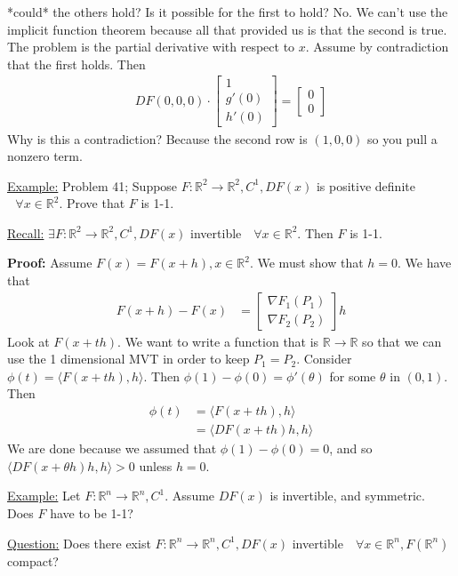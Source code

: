 \documentclass{article}
\newcommand*{\txt}[1]{\text{ #1 }}%
\newcommand*{\iprod}[1]{\langle #1 \rangle}
\newcommand*{\fora}{\txt{}\forall}%
\newcommand*{\rr}{\mathbb{R}}%
\begin{document}
*could* the others hold? Is it possible for the first to hold? No. We can't use the implicit function theorem because all that provided us is that the second is true. The problem is the partial derivative with respect to $x$. Assume by contradiction that the first holds. Then \begin{align*}
    DF(0,0,0)\cdot\begin{bmatrix}
        1\\
        g'(0)\\
        h'(0)
    \end{bmatrix}=\begin{bmatrix}
        0\\
        0
    \end{bmatrix}
\end{align*} Why is this a contradiction? Because the second row is $(1,0,0)$ so you pull a nonzero term. 

\underline{Example:} Problem 41; Suppose $F:\rr^2\to \rr^2, C^1, DF(x)$ is positive definite $\fora x\in \rr^2$. Prove that $F$ is 1-1.

\underline{Recall:} $\exists F:\rr^2\to \rr^2, C^1, DF(x)$ invertible $\fora x\in \rr^2$. Then $F$ is 1-1.

\textbf{Proof:} Assume $F(x)=F(x+h), x\in \rr^2$. We must show that $h=0$. We have that \begin{align*}
    F(x+h)-F(x)&=\begin{bmatrix}
        \nabla F_1(P_1)\\
        \nabla F_2(P_2)
    \end{bmatrix}h
\end{align*}Look at $F(x+th)$. We want to write a function that is $\rr\to\rr$ so that we can use the 1 dimensional MVT in order to keep $P_1=P_2$. Consider $\phi(t)=\iprod{F(x+th),h}$. Then $\phi(1)-\phi(0)=\phi'(\theta)$ for some $\theta$ in $(0,1)$. Then \begin{align*}
    \phi(t)&=\iprod{F(x+th),h}\\
    &=\iprod{DF(x+th)h,h}
\end{align*} We are done because we assumed that $\phi(1)-\phi(0)=0$, and so $\iprod{DF(x+\theta h)h,h}>0$ unless $h=0$. 

\underline{Example:} Let $F:\rr^n\to \rr^n, C^1$. Assume $DF(x)$ is invertible, and symmetric. Does $F$ have to be 1-1? 

\underline{Question:} Does there exist $F:\rr^n\to \rr^n, C^1, DF(x)$ invertible $\fora x\in \rr^n, F(\rr^n)$ compact? 
\end{document}
